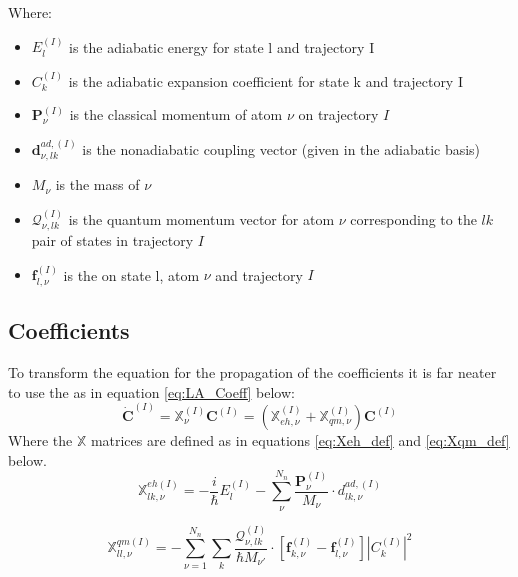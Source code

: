 \noindent Where:
\begin{itemize}
  \item $E_{l}^{(I)}$ is the adiabatic energy for state l and trajectory I
  \item $C_{k}^{(I)}$ is the adiabatic expansion coefficient for state k and trajectory I
  \item $\mathbf{P}_{\nu}^{(I)}$ is the classical momentum of atom $\nu$ on trajectory $I$
  \item $\mathbf{d}_{\nu, lk}^{ad, (I)}$ is the nonadiabatic coupling vector (given in the adiabatic basis)
  \item $M_{\nu}$ is the mass of  $\nu$
  \item $\mathcal{Q}_{\nu, lk}^{(I)}$ is the quantum momentum vector for atom $\nu$ corresponding to the $lk$ pair of states in trajectory $I$
  \item $\mathbf{f}_{l, \nu}^{(I)}$ is the  on state l, atom $\nu$ and trajectory $I$
\end{itemize}

\subsection{Coefficients}
To transform the equation for the propagation of the coefficients it is far neater to use the  as in equation \eqref{eq:LA_Coeff} below:
\begin{equation}
	\dot{\mathbf{C}}^{(I)} = \mathbb{X}_{\nu}^{(I)} \mathbf{C}^{(I)} = \left(\mathbb{X}_{eh, \nu}^{(I)} + \mathbb{X}_{qm, \nu}^{(I)}\right) \mathbf{C}^{(I)}
	\label{eq:LA_Coeff}
\end{equation}
Where the $\mathbb{X}$ matrices are defined as in equations \eqref{eq:Xeh_def} and \eqref{eq:Xqm_def} below.
\begin{equation}
  \mathbb{X}_{lk, \nu}^{eh (I)} = -\frac{i}{\hbar} E_{l}^{(I)} - \sum_{\nu}^{N_{n}}\frac{\mathbf{P}_{\nu}^{(I)}}{M_{\nu}} \cdot d_{lk, \nu}^{ad, (I)}
  \label{eq:Xeh_def}
\end{equation}

\begin{equation}
  \mathbb{X}_{ll, \nu}^{qm (I)} = -\sum_{\nu=1}^{N_{n}} \sum_{k} \frac{\mathcal{Q}_{\nu, lk}^{(I)}}{\hbar M_{\nu'}} \cdot \left[ \mathbf{f}_{k, \nu}^{(I)} - \mathbf{f}_{l, \nu}^{(I)} \right]  |C_{k}^{(I)}|^2
  \label{eq:Xqm_def}
\end{equation}

